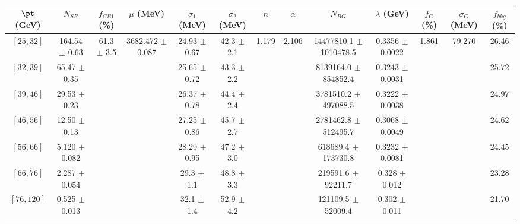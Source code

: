 \begin{tabular}{c||c|c|c|c|c|c|c|c|c|c|c||c}
$\pt$ (GeV) & $N_{SR}$ & $f_{CB1}$ (\%) & $\mu$ (MeV) & $\sigma_1$ (MeV) & $\sigma_2$ (MeV) & $n$ & $\alpha$ & $N_{BG}$ & $\lambda$ (GeV) & $f_G$ (\%) & $\sigma_G$ (MeV) & $f_{bkg}$ (\%) \\
\hline
$[25, 32]$ & 164.54 $\pm$ 0.63 & \multirow{7}{*}{61.3 $\pm$ 3.5} & \multirow{7}{*}{3682.472 $\pm$ 0.087} & 24.93 $\pm$ 0.67 & 42.3 $\pm$ 2.1 & \multirow{7}{*}{1.179} & \multirow{7}{*}{2.106} & 14477810.1 $\pm$ 1010478.5 & 0.3356 $\pm$ 0.0022 & \multirow{7}{*}{1.861} & \multirow{7}{*}{79.270} & 26.46\\
$[32, 39]$ & 65.47 $\pm$ 0.35 &  &  & 25.65 $\pm$ 0.72 & 43.3 $\pm$ 2.2 &  &  & 8139164.0 $\pm$ 854852.4 & 0.3243 $\pm$ 0.0031 &  &  & 25.72\\
$[39, 46]$ & 29.53 $\pm$ 0.23 &  &  & 26.37 $\pm$ 0.78 & 44.4 $\pm$ 2.4 &  &  & 3781510.2 $\pm$ 497088.5 & 0.3222 $\pm$ 0.0038 &  &  & 24.97\\
$[46, 56]$ & 12.50 $\pm$ 0.13 &  &  & 27.25 $\pm$ 0.86 & 45.7 $\pm$ 2.7 &  &  & 2781462.8 $\pm$ 512495.7 & 0.3068 $\pm$ 0.0049 &  &  & 24.62\\
$[56, 66]$ & 5.120 $\pm$ 0.082 &  &  & 28.29 $\pm$ 0.95 & 47.2 $\pm$ 3.0 &  &  & 618689.4 $\pm$ 173730.8 & 0.3232 $\pm$ 0.0081 &  &  & 24.45\\
$[66, 76]$ & 2.287 $\pm$ 0.054 &  &  & 29.3 $\pm$ 1.1 & 48.8 $\pm$ 3.3 &  &  & 219591.6 $\pm$ 92211.7 & 0.328 $\pm$ 0.012 &  &  & 23.28\\
$[76, 120]$ & 0.525 $\pm$ 0.013 &  &  & 32.1 $\pm$ 1.4 & 52.9 $\pm$ 4.2 &  &  & 121109.5 $\pm$ 52009.4 & 0.302 $\pm$ 0.011 &  &  & 21.70\\
\end{tabular}

